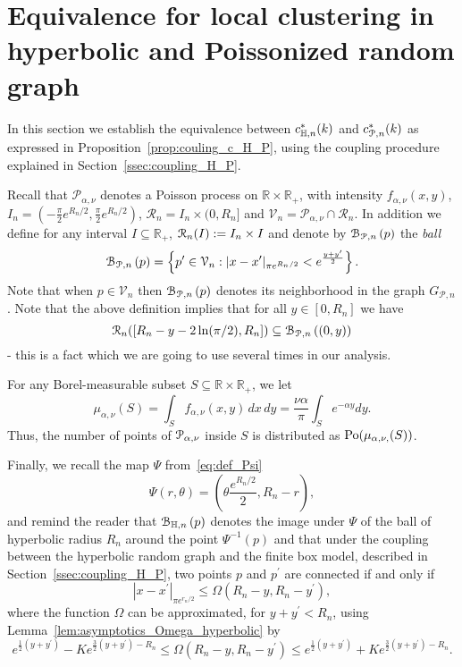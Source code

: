 \section{Equivalence for local clustering in hyperbolic and Poissonized random graph}

In this section we establish the equivalence between $c_{\mathbb{H},n}^\ast(k)$ and $c_{{\mathcal P},n}^\ast(k)$ as expressed in Proposition~\ref{prop:couling_c_H_P}, using the coupling procedure explained in Section~\ref{ssec:coupling_H_P}. 

Recall that $\mathcal{P}_{\alpha,\nu}$ denotes a Poisson process on $\mathbb{R} \times \mathbb{R}_+$, with intensity $f_{\alpha,\nu}(x,y)$, $I_n = \left(-\frac{\pi}{2}e^{R_n/2}, \frac{\pi}{2}e^{R_n/2}\right)$, $\mathcal{R}_n = I_n \times (0,R_n]$ and $\mathcal{V}_n = \mathcal{P}_{\alpha, \nu}\cap \mathcal{R}_n$. In addition we define for any interval $I \subseteq \mathbb{R}_+$, ${\mathcal R}_n(I) := I_n \times I$ and denote by ${\mathcal B}_{{\mathcal P},n}\left(p\right)$ the \emph{ball}
\[
	{\mathcal B}_{{\mathcal P},n}\left(p\right) = \left\{p^\prime \in \mathcal{V}_n : |x - x^\prime |_{\pi e^{R_n/2}} < e^{\frac{y+y^\prime}{2}}\right\}.
\]
Note that when $p \in \mathcal{V}_n$ then ${\mathcal B}_{{\mathcal P},n}\left(p\right)$ denotes its neighborhood in the graph $G_{\mathcal{P},n}$. 
Note that the above definition implies that for all $y\in [0,R_n]$ we have 
\begin{equation} \label{eq:upper_ballPo_inclusion}
{\mathcal R}_n([R_n-y - 2\ln (\pi/2), R_n]) \subseteq {\mathcal B}_{{\mathcal P},n}\left((0,y)\right)
\end{equation}
- this is a fact which we are going to use several times in our analysis. 

For any Borel-measurable subset $S \subseteq \mathbb{R} \times \mathbb{R}_+$, we let 
\[
	\mu_{\alpha, \nu} (S) = \int_S f_{\alpha, \nu}(x,y) \, dx \, dy = \frac{\nu \alpha}{\pi}\int_S e^{-\alpha y}dy.
\]
Thus, the number of points of ${\mathcal P}_{\alpha, \nu}$ inside $S$ is distributed as ${\mathrm{Po}} ({\mu_{\alpha, \nu,} (S)})$.

Finally, we recall the map $\Psi$ from~\eqref{eq:def_Psi}
\[
	\Psi(r,\theta) = \left(\theta \frac{e^{R_n/2}}{2}, R_n - r\right),
\] 
and remind the reader that ${\mathcal B}_{\mathbb{H},n}\left(p\right)$ denotes the image under $\Psi$ of the ball of hyperbolic radius $R_n$ around the point $\Psi^{-1}(p)$ and that under the coupling between the hyperbolic random graph and the finite box model, described in Section~\ref{ssec:coupling_H_P}, two points $p$ and $p^\prime$ are connected if and only if
\[
	|x-x^\prime|_{\pi e^{r_n/2}} \le \Omega(R_n - y, R_n - y^\prime),
\]
where the function $\Omega$ can be approximated, for $y + y^\prime < R_n$, using Lemma~\ref{lem:asymptotics_Omega_hyperbolic} by  
\[
	e^{\frac{1}{2}(y+y^\prime)} - K e^{\frac{3}{2}(y+y^\prime) - R_n} \leq \Omega(R_n - y, R_n - y^\prime) 
		\leq  e^{\frac{1}{2}(y+y^\prime)} + K e^{\frac{3}{2}(y+y^\prime) - R_n}.
\]

